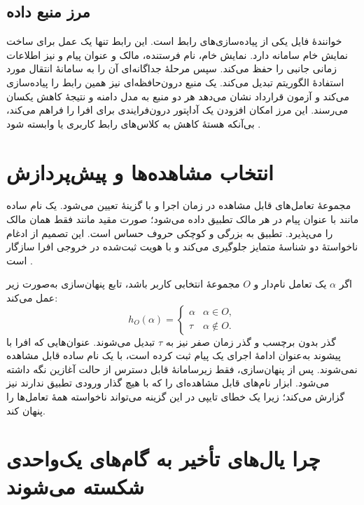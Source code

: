 \subsection{مرز منبع داده}

خوانندهٔ فایل یکی از پیاده‌سازی‌های رابط  است. این رابط تنها یک عمل برای ساخت نمایش خام سامانه دارد. نمایش خام، نام فرستنده، مالک و عنوان پیام و نیز اطلاعات زمانی جانبی را حفظ می‌کند. سپس مرحلهٔ جداگانه‌ای آن را به سامانهٔ انتقال مورد استفادهٔ الگوریتم تبدیل می‌کند. یک منبع درون‌حافظه‌ای نیز همین رابط را پیاده‌سازی می‌کند و آزمون قرارداد نشان می‌دهد هر دو منبع به مدل دامنه و نتیجهٔ کاهش یکسان می‌رسند. این مرز امکان افزودن یک آداپتور درون‌فرایندی برای افرا را فراهم می‌کند، بی‌آنکه هستهٔ کاهش به کلاس‌های رابط کاربری یا  وابسته شود \cite{AfraWeakTimedReduction2026}.

\section{انتخاب مشاهده‌ها و پیش‌پردازش}

مجموعهٔ تعامل‌های قابل مشاهده در زمان اجرا و با گزینهٔ  تعیین می‌شود. یک نام ساده مانند  با عنوان پیام در هر مالک تطبیق داده می‌شود؛ صورت مقید مانند  فقط همان مالک را می‌پذیرد. تطبیق به بزرگی و کوچکی حروف حساس است. این تصمیم از ادغام ناخواستهٔ دو شناسهٔ متمایز جلوگیری می‌کند و با هویت ثبت‌شده در خروجی افرا سازگار است \cite{StateSpaceAnalysisGitHub2026,StateSpaceTransformerGitHub2026}.

اگر $\alpha$ یک تعامل نام‌دار و $O$ مجموعهٔ انتخابی کاربر باشد، تابع پنهان‌سازی به‌صورت زیر عمل می‌کند:
\[
h_O(\alpha)=
\begin{cases}
\alpha & \alpha\in O,\\
\tau & \alpha\notin O.
\end{cases}
\]
گذر بدون برچسب و گذر زمان صفر نیز به $\tau$ تبدیل می‌شوند. عنوان‌هایی که افرا با پیشوند  به‌عنوان ادامهٔ اجرای یک پیام ثبت کرده است، با یک نام ساده قابل مشاهده نمی‌شوند. پس از پنهان‌سازی، فقط زیرسامانهٔ قابل دسترس از حالت آغازین نگه داشته می‌شود. ابزار نام‌های قابل مشاهده‌ای را که با هیچ گذار ورودی تطبیق ندارند نیز گزارش می‌کند؛ زیرا یک خطای تایپی در این گزینه می‌تواند ناخواسته همهٔ تعامل‌ها را پنهان کند.

\section{چرا یال‌های تأخیر به گام‌های یک‌واحدی شکسته می‌شوند}
\label{sec:unit-splitting}
\label{sec:time-semantics-decision}

